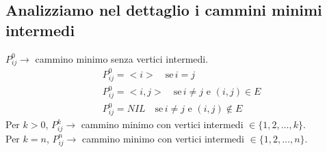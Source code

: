 \subsection*{Analizziamo nel dettaglio i cammini minimi intermedi}
$P^0_{ij} \rightarrow$ cammino minimo senza vertici intermedi.
\begin{align*}
  &P^0_{ij} = <i> \quad \text{se} \, i=j \\
  &P^0_{ij} = <i,j> \quad \text{se} \, i \neq j \text{ e } (i,j) \in E \\
  &P^0_{ij} = NIL \quad \text{se} \, i \neq j \text{ e } (i,j) \notin E
\end{align*}
Per $k > 0$, $P^k_{ij} \rightarrow$ cammino minimo con vertici intermedi $\in \{1,2,\dots,k\}$.\\
Per $k = n$, $P^n_{ij} \rightarrow$ cammino minimo con vertici intermedi $\in \{1,2,\dots,n\}$.\\

